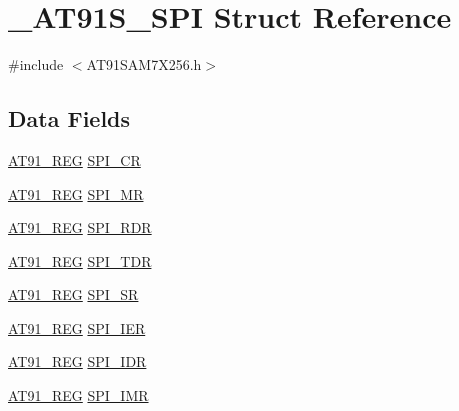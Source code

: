 \hypertarget{struct__AT91S__SPI}{\section{\-\_\-\-A\-T91\-S\-\_\-\-S\-P\-I Struct Reference}
\label{struct__AT91S__SPI}
}


{\ttfamily \#include $<$A\-T91\-S\-A\-M7\-X256.\-h$>$}

\subsection*{Data Fields}
\begin{DoxyCompactItemize}
\item 
\hyperlink{GCC_2ARM7__AT91SAM7S_2AT91SAM7X256_8h_a712ad5a1ac1bd02f3e95a7526c283ce1}{A\-T91\-\_\-\-R\-E\-G} \hyperlink{struct__AT91S__SPI_a5d6553c05d0a9468b53a3521e9dc2d03}{S\-P\-I\-\_\-\-C\-R}
\item 
\hyperlink{GCC_2ARM7__AT91SAM7S_2AT91SAM7X256_8h_a712ad5a1ac1bd02f3e95a7526c283ce1}{A\-T91\-\_\-\-R\-E\-G} \hyperlink{struct__AT91S__SPI_a53c8dfe2e423e8032df8655ea1c55ae3}{S\-P\-I\-\_\-\-M\-R}
\item 
\hyperlink{GCC_2ARM7__AT91SAM7S_2AT91SAM7X256_8h_a712ad5a1ac1bd02f3e95a7526c283ce1}{A\-T91\-\_\-\-R\-E\-G} \hyperlink{struct__AT91S__SPI_a2e4e0521afa48de31a6c6ab7b395a1b4}{S\-P\-I\-\_\-\-R\-D\-R}
\item 
\hyperlink{GCC_2ARM7__AT91SAM7S_2AT91SAM7X256_8h_a712ad5a1ac1bd02f3e95a7526c283ce1}{A\-T91\-\_\-\-R\-E\-G} \hyperlink{struct__AT91S__SPI_a11135c353bb5ac7311dbd52934205d6c}{S\-P\-I\-\_\-\-T\-D\-R}
\item 
\hyperlink{GCC_2ARM7__AT91SAM7S_2AT91SAM7X256_8h_a712ad5a1ac1bd02f3e95a7526c283ce1}{A\-T91\-\_\-\-R\-E\-G} \hyperlink{struct__AT91S__SPI_a88f90286651b43730ca1e186224dd921}{S\-P\-I\-\_\-\-S\-R}
\item 
\hyperlink{GCC_2ARM7__AT91SAM7S_2AT91SAM7X256_8h_a712ad5a1ac1bd02f3e95a7526c283ce1}{A\-T91\-\_\-\-R\-E\-G} \hyperlink{struct__AT91S__SPI_a789ac88d795620768b33e76cea5d7c15}{S\-P\-I\-\_\-\-I\-E\-R}
\item 
\hyperlink{GCC_2ARM7__AT91SAM7S_2AT91SAM7X256_8h_a712ad5a1ac1bd02f3e95a7526c283ce1}{A\-T91\-\_\-\-R\-E\-G} \hyperlink{struct__AT91S__SPI_a8b1413ef206fd57fcd3dbedaeebbb0a5}{S\-P\-I\-\_\-\-I\-D\-R}
\item 
\hyperlink{GCC_2ARM7__AT91SAM7S_2AT91SAM7X256_8h_a712ad5a1ac1bd02f3e95a7526c283ce1}{A\-T91\-\_\-\-R\-E\-G} \hyperlink{struct__AT91S__SPI_aa276a1765641b516aafb1cd399aaca7f}{S\-P\-I\-\_\-\-I\-M\-R}

\end{DoxyCompactItemize}
